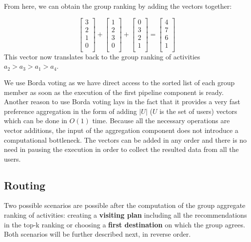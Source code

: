 \documentclass[11pt,a4paper,oneside]{article}
\begin{document}
From here, we can obtain the group ranking by adding the vectors together:

\begin{equation}
    \begin{bmatrix}
    3 \\
    2 \\
    1 \\
    0 \\
    \end{bmatrix} + 
    \begin{bmatrix}
    1 \\
    2 \\
    3 \\
    0 \\
    \end{bmatrix} + 
    \begin{bmatrix}
    0 \\
    3 \\
    2 \\
    1 \\
    \end{bmatrix} = 
    \begin{bmatrix}
    4 \\
    7 \\
    6 \\
    1 \\
    \end{bmatrix}
\end{equation}
This vector now translates back to the group ranking of activities $a_2 > a_3 > a_1 > a_4$.

We use Borda voting as we have direct access to the sorted list of each group member as soon as the execution of the first pipeline component is ready. Another reason to use Borda voting lays in the fact that it provides a very fast preference aggregation in the form of adding $|U|$ ($U$ is the set of users) vectors which can be done in $O(1)$ time. Because all the necessary operations are vector additions, the input of the aggregation component does not introduce a computational bottleneck. The vectors can be added in any order and there is no need in pausing the execution in order to collect the resulted data from all the users.

\subsection{Routing}
Two possible scenarios are possible after the computation of the group aggregate ranking of activities: creating a \textbf{visiting plan} including all the recommendations in the top-k ranking or choosing a \textbf{first destination} on which the group agrees. Both scenarios will be further described next, in reverse order.
\end{document}
